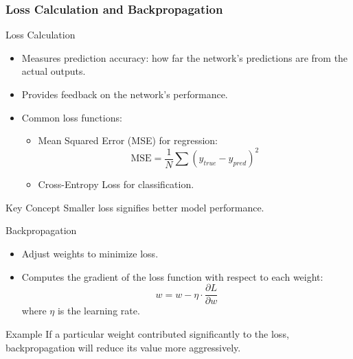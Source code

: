 \documentclass[aspectratio=169]{beamer}
\begin{document}
\begin{frame}[fragile]
    \frametitle{Loss Calculation and Backpropagation}

    \begin{block}{Loss Calculation}
        \begin{itemize}
            \item Measures prediction accuracy: how far the network's predictions are from the actual outputs.
            \item Provides feedback on the network's performance.
            \item Common loss functions:
            \begin{itemize}
                \item Mean Squared Error (MSE) for regression:
                \begin{equation}
                    \text{MSE} = \frac{1}{N} \sum (y_{true} - y_{pred})^2
                \end{equation}
                \item Cross-Entropy Loss for classification.
            \end{itemize}
        \end{itemize}
        \begin{block}{Key Concept}
            Smaller loss signifies better model performance.
        \end{block}
    \end{block}

    \begin{block}{Backpropagation}
        \begin{itemize}
            \item Adjust weights to minimize loss.
            \item Computes the gradient of the loss function with respect to each weight:
            \begin{equation}
                w = w - \eta \cdot \frac{\partial L}{\partial w}
            \end{equation}
            where \(\eta\) is the learning rate.
        \end{itemize}
        \begin{block}{Example}
            If a particular weight contributed significantly to the loss, backpropagation will reduce its value more aggressively.
        \end{block}
    \end{block}
\end{frame}
\end{document}
